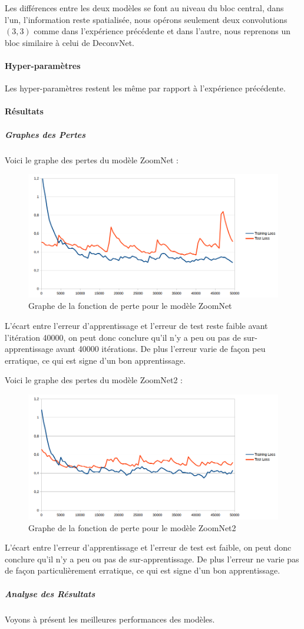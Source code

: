 \documentclass[a4paper, 11pt]{report}
\begin{document}
Les différences entre les deux modèles se font au niveau du bloc central, dans l'un, l'information reste spatialisée, nous opérons seulement deux convolutions $(3, 3)$ comme dans l'expérience précédente et dans l'autre, nous reprenons un bloc similaire à celui de DeconvNet.
\paragraph{Hyper-paramètres}
Les hyper-paramètres restent les même par rapport à l'expérience précédente.
\paragraph{Résultats}
\subparagraph{Graphes des Pertes}
Voici le graphe des pertes du modèle ZoomNet :
\begin{figure}[H]
	\centering
	\includegraphics[scale=0.6]{Images/Losses_ZoomNet.png}
	\caption{Graphe de la fonction de perte pour le modèle ZoomNet}
\end{figure}
L'écart entre l'erreur d'apprentissage et l'erreur de test reste faible avant l'itération 40000, on peut donc conclure qu'il n'y a peu ou pas de sur-apprentissage avant 40000 itérations.
De plus l'erreur varie de façon peu erratique, ce qui est signe d'un bon apprentissage.

Voici le graphe des pertes du modèle ZoomNet2 :
\begin{figure}[H]
	\centering
	\includegraphics[scale=0.6]{Images/Losses_ZoomNet2.png}
	\caption{Graphe de la fonction de perte pour le modèle ZoomNet2}
\end{figure}
L'écart entre l'erreur d'apprentissage et l'erreur de test est faible, on peut donc conclure qu'il n'y a peu ou pas de sur-apprentissage.
De plus l'erreur ne varie pas de façon particulièrement erratique, ce qui est signe d'un bon apprentissage.
\subparagraph{Analyse des Résultats}
Voyons à présent les meilleures performances des modèles.
\end{document}
